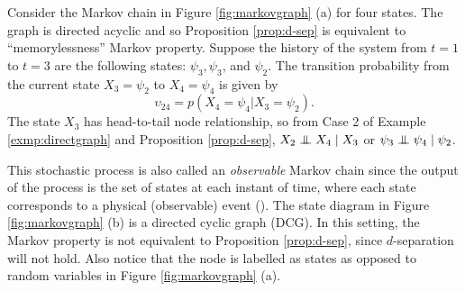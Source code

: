 \begin{exmp}
Consider the Markov chain in Figure \ref{fig:markovgraph} (a) for four states. The graph is directed acyclic and so Proposition \ref{prop:d-sep} is equivalent to ``memorylessness'' Markov property. Suppose the history of the system from $t=1$ to $t = 3$ are the following states: $\psi_3,\psi_3$, and $\psi_2$. The transition probability from the current state $X_3=\psi_2$ to $X_4=\psi_4$ is given by
$$
\upsilon_{24}= p(X_4=\psi_4|X_3=\psi_2).
$$
The state $X_3$ has head-to-tail node relationship, so from Case 2 of Example \ref{exmp:directgraph} and Proposition \ref{prop:d-sep}, $X_2\mathrel{\perp\mspace{-10mu}\perp} X_4\mid X_3$ or $\psi_3\mathrel{\perp\mspace{-10mu}\perp}\psi_4\mid\psi_2$. 
\end{exmp}
This stochastic process is also called an \textit{observable} Markov chain since the output of the process is the set of states at each instant of time, where each state corresponds to a physical (observable) event (\cite{Rabiner89atutorial}). The state diagram in Figure \ref{fig:markovgraph} (b) is a directed cyclic graph (DCG). In this setting, the Markov property is not equivalent to Proposition \ref{prop:d-sep}, since $d$-separation will not hold. Also notice that the node is labelled as states as opposed to random variables in Figure \ref{fig:markovgraph} (a).
